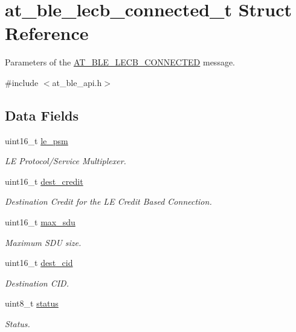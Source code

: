 \hypertarget{structat__ble__lecb__connected__t}{}\section{at\+\_\+ble\+\_\+lecb\+\_\+connected\+\_\+t Struct Reference}
\label{structat__ble__lecb__connected__t}


Parameters of the \mbox{\hyperlink{at__ble__api_8h_a3324640b95f33169515f89738ed5baeba8e0cc9a45665c4244a72002d4dc147a2}{A\+T\+\_\+\+B\+L\+E\+\_\+\+L\+E\+C\+B\+\_\+\+C\+O\+N\+N\+E\+C\+T\+ED}} message.  




{\ttfamily \#include $<$at\+\_\+ble\+\_\+api.\+h$>$}

\subsection*{Data Fields}
\begin{DoxyCompactItemize}
\item 
uint16\+\_\+t \mbox{\hyperlink{structat__ble__lecb__connected__t_a2dad6ef37aefd9fc94375d265be0c7c9}{le\+\_\+psm}}
\begin{DoxyCompactList}\small\item\em LE Protocol/\+Service Multiplexer. \end{DoxyCompactList}\item 
uint16\+\_\+t \mbox{\hyperlink{structat__ble__lecb__connected__t_ac885778ddeb570d83c60b0d142d9de73}{dest\+\_\+credit}}
\begin{DoxyCompactList}\small\item\em Destination Credit for the LE Credit Based Connection. \end{DoxyCompactList}\item 
uint16\+\_\+t \mbox{\hyperlink{structat__ble__lecb__connected__t_a4b5effde26a738c2ddaad78c595bf745}{max\+\_\+sdu}}
\begin{DoxyCompactList}\small\item\em Maximum S\+DU size. \end{DoxyCompactList}\item 
uint16\+\_\+t \mbox{\hyperlink{structat__ble__lecb__connected__t_a37d822ac0a55245d703099a527d6bd3a}{dest\+\_\+cid}}
\begin{DoxyCompactList}\small\item\em Destination C\+ID. \end{DoxyCompactList}\item 
uint8\+\_\+t \mbox{\hyperlink{structat__ble__lecb__connected__t_ade818037fd6c985038ff29656089758d}{status}}
\begin{DoxyCompactList}\small\item\em Status. \end{DoxyCompactList}\end{DoxyCompactItemize}


